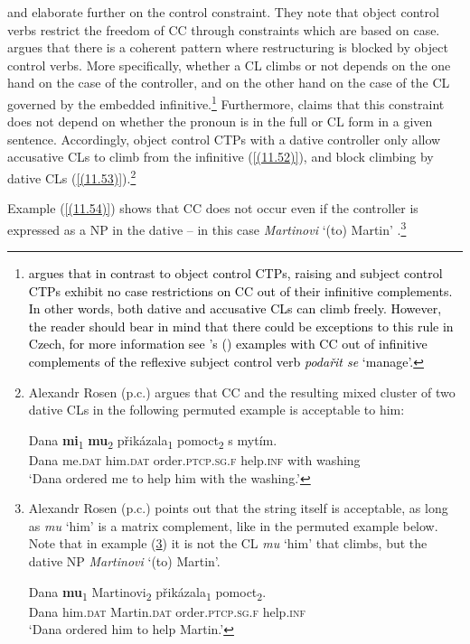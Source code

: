 \citet{Rezac05} and \citet[79]{Dotlacil04} elaborate further on the control constraint. They note that object control verbs restrict the freedom of CC through constraints which are based on case. \citet[17]{Rezac05} argues that there is a coherent pattern where restructuring is blocked by object control verbs. More specifically, whether a CL climbs or not depends on the one hand on the case of the controller, and on the other hand on the case of the CL governed by the embedded infinitive.\footnote{\textcolor{black}{\citet[17]{Rezac05} argues that in contrast to object control CTPs, raising and subject control CTPs exhibit no case restrictions on CC out of their infinitive complements. In other words, both dative and accusative CLs can climb freely. However, the reader should bear in mind that there could be exceptions to this rule in Czech, for more information see \citeauthor{Lenertova04}'s (\citeyear[159f]{Lenertova04}) examples with CC out of infinitive complements of the reflexive subject control verb \textit{podařit se} ‘manage’.}} Furthermore, \citet[7]{Rezac05} claims that this constraint does not depend on whether the pronoun is in the full or CL form in a given sentence. Accordingly, object control CTPs with a dative controller only allow accusative CLs to climb from the infinitive (\ref{(11.52)}), and block climbing by dative CLs (\ref{(11.53)}).\footnote{Alexandr Rosen (p.c.) argues that CC and the resulting mixed cluster of two dative CLs in the following permuted example is acceptable to him: 
	
\ea\label{(11.53b)}
\gll Dana \textbf{mi}\textsubscript{1} \textbf{mu}\textsubscript{2} přikázala\textsubscript{1} pomoct\textsubscript{2} s mytím. \\
 Dana me.\textsc{dat} him.\textsc{dat} order.\textsc{ptcp}.\textsc{sg}.\textsc{f} help.\textsc{inf} with washing \\
\glt ‘Dana ordered me to help him with the washing.’
\hfill 
\z
} 

Example (\ref{(11.54)}) shows that CC does not occur even if the controller is expressed as a NP in the dative – in this case \textit{Martinovi} ‘(to) Martin’ \citep[cf.][17f]{Rezac05}.\footnote{Alexandr Rosen (p.c.) points out that the string itself is acceptable, as long as \textit{mu} ‘him’ is a matrix complement, like in the permuted example below. Note that in example (\ref{(11.54b)}) it is not the CL \textit{mu} ‘him’ that climbs, but the dative NP \textit{Martinovi} ‘(to) Martin’.

\ea\label{(11.54b)}
\gll Dana \textbf{mu}\textsubscript{1} Martinovi\textsubscript{2} přikázala\textsubscript{1} pomoct\textsubscript{2}. \\
 Dana him.\textsc{dat} Martin.\textsc{dat} order.\textsc{ptcp}.\textsc{sg}.\textsc{f} help.\textsc{inf} \\
\glt ‘Dana ordered him to help Martin.’
\z
}


